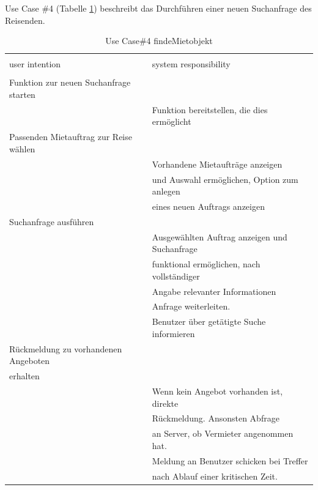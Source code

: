 \newpage
Use Case \#4 (Tabelle \ref{tab:mietobjektUC}) beschreibt das Durchführen einer neuen Suchanfrage des Reisenden.
\begin{table}[H]
\caption{Use Case\#4 findeMietobjekt }
\centering
\begin{tabular}{l l}
\\ [-0.5ex]

\hline\hline
\\ [-0.5ex]
user intention & system responsibility
\\ [1.5ex]
\hline
\\ [-0.5ex]
Funktion zur neuen Suchanfrage starten    &                                   \\[1ex]
                              & Funktion bereitstellen, die dies ermöglicht   \\[1ex]
Passenden Mietauftrag zur Reise wählen &                                   \\[1ex]
                              & Vorhandene Mietaufträge anzeigen \\[1ex]
                              & und Auswahl ermöglichen, Option zum anlegen   \\[1ex]
                              & eines neuen Auftrags anzeigen              \\[1ex]
Suchanfrage ausführen               &                                   \\[1ex] 
                              & Ausgewählten Auftrag anzeigen  und Suchanfrage   \\[1ex]
                              & funktional ermöglichen, nach vollständiger      \\[1ex]
                              & Angabe relevanter Informationen \\[1ex]
                              & Anfrage weiterleiten. \\[1ex]
                              & Benutzer über getätigte Suche informieren     \\[1ex]
Rückmeldung zu vorhandenen Angeboten   &                                   \\[1ex]
erhalten                      &                                   \\[1ex]
                              & Wenn kein Angebot vorhanden ist, direkte      \\[1ex]
                              & Rückmeldung. Ansonsten Abfrage    \\[1ex]
                              & an Server, ob Vermieter angenommen hat.    \\[1ex]
                              & Meldung an Benutzer schicken bei Treffer      \\[1ex]
                              & nach Ablauf einer kritischen Zeit.            \\[1ex]
\hline
\end{tabular}
\label{tab:mietobjektUC}
\end{table}

